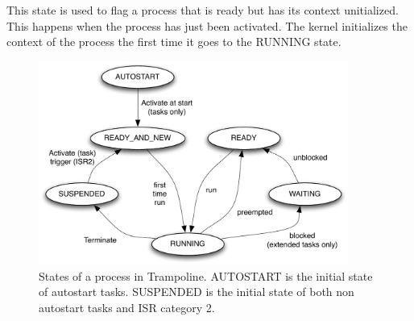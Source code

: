 This state is used to flag a process that is ready but has its context unitialized. This happens when the process has just been activated. The kernel initializes the context of the process the first time it goes to the RUNNING state.

\begin{figure}[htbp] %
   \centering
   \includegraphics[width=4in]{pictures/states.pdf} 
   \caption{States of a process in Trampoline. AUTOSTART is the initial state of autostart tasks. SUSPENDED is the initial state of both non autostart tasks and ISR category 2.}
   \label{fig:states}
\end{figure} 
